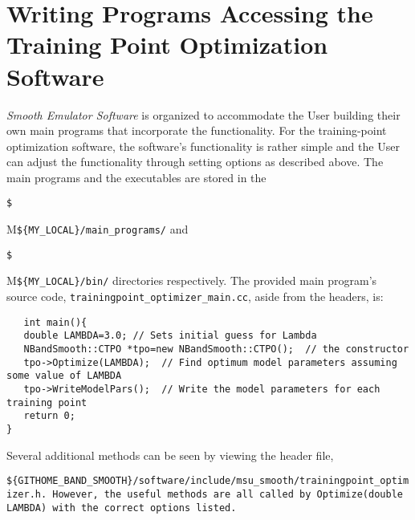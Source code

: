 \documentclass[UserManual.tex]{subfiles}
\begin{document}
\section{Writing Programs Accessing the Training Point Optimization Software}
{\it Smooth Emulator Software} is organized to accommodate the User building their own main programs that incorporate the functionality. For the training-point optimization software, the software's functionality is rather simple and the User can adjust the functionality through setting options as described above. The main programs and the executables are stored in the {\tt \${M{\tt \$\{MY\_LOCAL\}/main\_programs/} and {\tt \${M{\tt \$\{MY\_LOCAL\}/bin/} directories respectively. The provided main program's source code, {\tt trainingpoint\_optimizer\_main.cc}, aside from the headers, is:
{\tt\begin{verbatim}
   int main(){
   double LAMBDA=3.0; // Sets initial guess for Lambda
   NBandSmooth::CTPO *tpo=new NBandSmooth::CTPO();  // the constructor
   tpo->Optimize(LAMBDA);  // Find optimum model parameters assuming some value of LAMBDA
   tpo->WriteModelPars();  // Write the model parameters for each training point
   return 0;
}
\end{verbatim}
}
Several additional methods can be seen by viewing the header file, {\tt \$\{{GITHOME\_BAND\_SMOOTH\}/software/include/msu\_smooth/trainingpoint\_optimizer.h}. However, the useful methods are all called by {\tt Optimize(double LAMBDA)} with the correct options listed.

}}}}}
\end{document}
